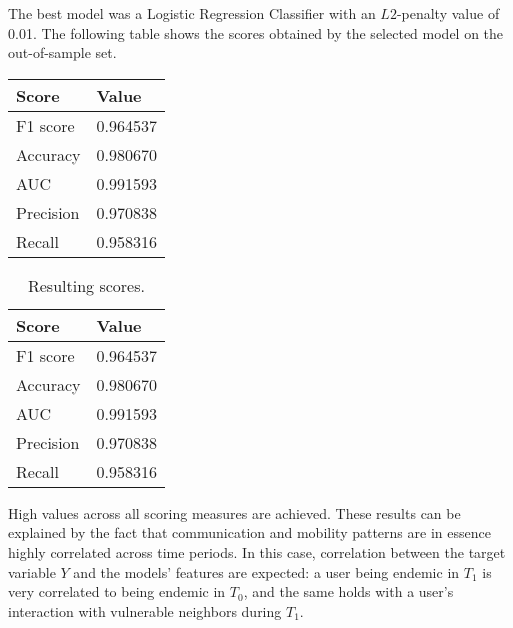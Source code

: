 

The best model was a Logistic Regression Classifier with an $L2$-penalty value of 0.01. 
The following table
shows the scores obtained by the selected model on the out-of-sample set.

\begin{center}
	\begin{tabular}{ l l }
		\toprule
		Score & Value \\
		\midrule
		F1 score & 0.964537  \\
		Accuracy & 0.980670  \\
		AUC    & 0.991593  \\
		Precision & 0.970838  \\
		Recall  & 0.958316  \\
		\bottomrule
	\end{tabular}
\end{center}


\begin{table}[ht]
	\caption{Resulting scores.}
	\label{tab:results}
	\centering
	\begin{tabular}{ l l }
		\toprule
		Score & Value \\
		\midrule
		F1 score & 0.964537  \\
		Accuracy & 0.980670  \\
		AUC    & 0.991593  \\
		Precision & 0.970838  \\
		Recall  & 0.958316  \\
		\bottomrule
	\end{tabular}
\end{table}

High values across all scoring measures are achieved. %
These results can be explained by the fact that 
communication and mobility patterns are in essence highly correlated across time periods. 
In this case, correlation between the target variable $Y$ and the models' features are expected:
a user being endemic in $T_1$ is very correlated to being endemic in $T_0$, and the same holds with a user's interaction with vulnerable neighbors during $T_1$.

